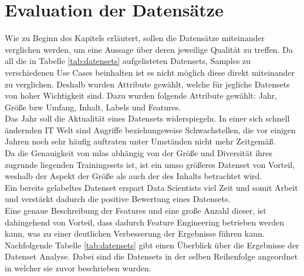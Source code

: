 \documentclass[
    12pt, %
    DIV10,
    ngerman, %
    a4paper, %
    oneside, %
    titlepage, %
    parskip=half, %
    headings=normal, %
    listof=totoc, %
    bibliography=totoc, %
    index=totoc, %
    captions=tableheading, %
    final %
]{scrreprt}
\begin{document}
\section{Evaluation der Datensätze}
Wie zu Beginn des Kapitels erläutert, sollen die Datensätze miteinander verglichen werden, um eine Aussage über deren jeweilige Qualität zu treffen. Da all die in Tabelle \ref{tab:datensets} aufgelisteten Datensets, Samples zu verschiedenen Use Cases beinhalten ist es nicht möglich diese direkt miteinander zu verglichen. Deshalb wurden Attribute gewählt, welche für jegliche Datensets von hoher Wichtigkeit sind. Dazu wurden folgende Attribute gewählt: Jahr, Grö{\ss}e bzw Umfang, Inhalt, Labels und Features.\\
Das Jahr soll die Aktualität eines Datensets widerspiegeln. In einer sich schnell ändernden IT Welt sind Angriffe beziehungsweise Schwachstellen, die vor einigen Jahren noch sehr häufig auftraten unter Umständen nicht mehr Zeitgemä{\ss}.\\
Da die Genauigkeit von \ac{mlas} abhängig von der Grö{\ss}e und Diversität ihres zugrunde liegenden Trainingssets ist, ist ein umso grö{\ss}eres Datenset von Vorteil, weshalb der Aspekt der Grö{\ss}e als auch der des Inhalts betrachtet wird.\\
Ein bereits gelabeltes Datenset erspart Data Scientists viel Zeit und somit Arbeit und verstärkt dadurch die positive Bewertung eines Datensets.\\
Eine genaue Beschreibung der Features und eine gro{\ss}e Anzahl dieser, ist dahingehend von Vorteil, dass dadurch Feature Engineering betrieben werden kann, was zu einer deutlichen Verbesserung der Ergebnisse führen kann.\\
Nachfolgende Tabelle \ref{tab:datensets} gibt einen Überblick über die Ergebnisse der Datenset Analyse. Dabei sind die Datensets in der selben Reihenfolge angeordnet in welcher sie zuvor beschrieben wurden.
\end{document}
